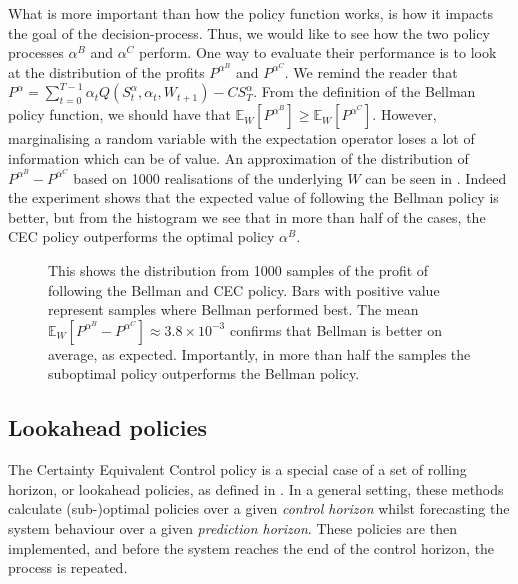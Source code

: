 \documentclass[main.tex]{subfiles}
\begin{document}
What is more important than how the policy function works, is how it
impacts the goal of the decision-process. Thus, we would like to see
how the two policy processes $\alpha^B$ and $\alpha^C$ perform.
One way to evaluate their performance is to look at
the distribution of the profits $P^{\alpha^B}$ and $P^{\alpha^C}$.
We remind the reader that
$P^\alpha =
\sum_{t=0}^{T-1}\alpha_tQ(S_t^\alpha,\alpha_t,W_{t+1})-CS_T^\alpha$.
From the definition of the Bellman policy function, we should have
that $\mathbb E_W[P^{\alpha^B}]\geq \mathbb E_W[P^{\alpha^C}]$.
However, marginalising a random variable with the expectation operator
loses a lot of information which can be of value.
An approximation of the distribution of
$P^{\alpha^B}-P^{\alpha^C}$ based on 1000 realisations of the
underlying $W$ can be seen in .
Indeed the experiment shows that the expected value of following the
Bellman policy is better, but from the histogram we see that
in more than half of the cases, the CEC policy outperforms the optimal
policy $\alpha^B$.
\begin{figure}[htbp]
  \centering
  \caption{This shows the distribution from 1000 samples of
    the profit of following the Bellman and CEC policy. Bars with
    positive value represent samples where Bellman performed best.
    The mean $\mathbb E_W[P^{\alpha^B}-P^{\alpha^C}]\approx 3.8\times
    10^{-3}$ confirms that Bellman is better on average, as expected.
    Importantly, in more than half the samples the suboptimal policy
    outperforms the Bellman policy.
  }\label{fig:bellman_det_vals}
\end{figure}

\subsection{Lookahead policies}
The Certainty Equivalent Control policy is a special case of
a set of rolling horizon, or lookahead policies, as defined in
\citep[Ch.~6]{powell2011approximate}.
In a general setting, these methods
calculate (sub-)optimal policies over a given \emph{control
  horizon} whilst forecasting the system behaviour over a given
\emph{prediction horizon}.
These policies are then implemented, and before the system reaches the
end of the control horizon, the process is repeated.
\end{document}

